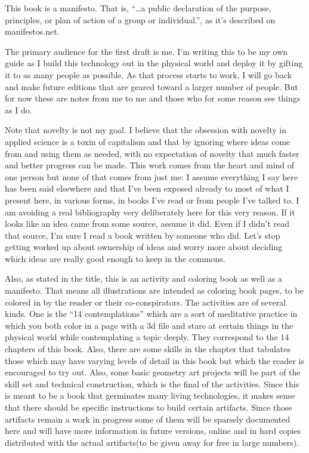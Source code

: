 This book is a manifesto. That is, ``\ldots{}a public declaration of the
purpose, principles, or plan of action of a group or individual.'', as
it's described on manifestos.net.

The primary audience for the first draft is me. I'm writing this to be
my own guide as I build this technology out in the physical world and
deploy it by gifting it to as many people as possible. As that process
starts to work, I will go back and make future editions that are geared
toward a larger number of people. But for now these are notes from me to
me and those who for some reason see things as I do.

Note that novelty is not my goal. I believe that the obsession with
novelty in applied science is a toxin of capitalism and that by ignoring
where ideas come from and using them as needed, with no expectation of
novelty that much faster and better progress can be made. This work
comes from the heart and mind of one person but none of that comes from
just me: I assume everything I say here has been said elsewhere and that
I've been exposed already to most of what I present here, in various
forms, in books I've read or from people I've talked to. I am avoiding a
real bibliography very deliberately here for this very reason. If it
looks like an idea came from some source, assume it did. Even if I
didn't read that source, I'm sure I read a book written by someone who
did. Let's stop getting worked up about ownership of ideas and worry
more about deciding which ideas are really good enough to keep in the
commons.

Also, as stated in the title, this is an activity and coloring book as
well as a manifesto. That means all illustrations are intended as
coloring book pages, to be colored in by the reader or their
co-conspirators. The activities are of several kinds. One is the ``14
contemplations'' which are a sort of meditative practice in which you
both color in a page with a 3d file and stare at certain things in the
physical world while contemplating a topic deeply. They correspond to
the 14 chapters of this book. Also, there are some skills in the chapter
that tabulates those which may have varying levels of detail in this
book but which the reader is encouraged to try out. Also, some basic
geometry art projects will be part of the skill set and technical
construction, which is the final of the activities. Since this is meant
to be a book that germinates many living technologies, it makes sense
that there should be specific instructions to build certain artifacts.
Since those artifacts remain a work in progress some of them will be
sparsely documented here and will have more information in future
versions, online and in hard copies distributed with the actual
artifacts(to be given away for free in large numbers).

